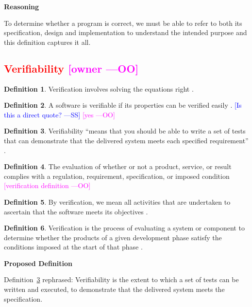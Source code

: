 \documentclass[letterpaper,cleveref]{lipics-v2019}
\newcommand{\authornote}[3]{\textcolor{#1}{[#3 ---#2]}}
\newcommand{\authornote}[3]{}
\newcommand{\wss}[1]{\authornote{blue}{SS}{#1}} %
\newcommand{\oo}[1]{\authornote{magenta}{OO}{#1}} %
\newcommand{\notdone}[1]{\textcolor{red}{#1}}
\theoremstyle{definition}
\newtheorem{defn}{Definition}
\begin{document}
\noindent \textbf{Reasoning}

To determine whether a program is correct, we must be able to refer to both its
specification, design and implementation to understand the intended purpose and
this definition captures it all.

\subsection{\notdone{Verifiability} \oo{owner}}

\begin{defn}
	Verification involves solving the equations right \citep[p.~23]{Roache1998}.
\end{defn}

\begin{defn}
  A software is verifiable if its properties can be verified easily
  \citep{GhezziEtAl2003}.  \wss{Is this a direct quote?} \oo{yes}
\end{defn}

\begin{defn} \label{Defn_Verifiability1}
Verifiability ``means that you should be able to write a set of tests that can
demonstrate that the delivered system meets each specified requirement'' \citep{sommerville}.	
\end{defn}

\begin{defn}
	The evaluation of whether or not a product, service, or result complies with
	a regulation, requirement, specification, or imposed condition \citep{project2017guide}
	\oo {verification definition}
\end{defn}

\begin{defn}
	By verification, we mean all activities that are undertaken to ascertain that the
	software meets its objectives \citep{GhezziEtAl2003}.
\end{defn}

\begin{defn}
	 Verification is the process of evaluating a system or component to determine whether the products
	 of a given development phase satisfy the conditions imposed at the start of that phase \citep{IEEEStdGlossarySET1990}.
\end{defn}
\noindent \textbf{Proposed Definition}

Definition~\ref{Defn_Verifiability1} rephrased:
Verifiability is the extent to which a set of tests can be written and executed, to demonstrate
that the delivered system meets the specification.
\end{document}
